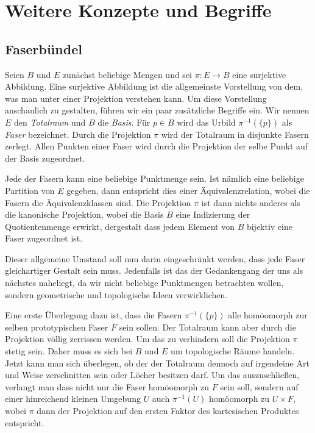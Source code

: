 

\chapter{Weitere Konzepte und Begriffe}

\section{Faserbündel}

Seien $B$ und $E$ zunächst beliebige Mengen und sei $\pi\colon E\to B$
eine surjektive Abbildung. Eine surjektive Abbildung ist die allgemeinste
Vorstellung von dem, was man unter einer Projektion verstehen kann.
Um diese Vorstellung anschaulich zu gestalten, führen wir ein paar
zusätzliche Begriffe ein. Wir nennen $E$ den \emph{Totalraum} und $B$
die \emph{Basis}. Für $p\in B$ wird das Urbild $\pi^{-1}(\{p\})$ als
\emph{Faser} bezeichnet. Durch die Projektion $\pi$ wird der Totalraum
in disjunkte Fasern zerlegt. Allen Punkten einer Faser wird durch
die Projektion der selbe Punkt auf der Basis zugeordnet.

Jede der Fasern kann eine beliebige Punktmenge sein. Ist nämlich eine
beliebige Partition von $E$ gegeben, dann entspricht dies einer
Äquivalenzrelation, wobei die Fasern die Äquivalenzklassen sind.
Die Projektion $\pi$ ist dann nichts anderes als die kanonische
Projektion, wobei die Basis $B$ eine Indizierung der Quotientenmenge
erwirkt, dergestalt dass jedem Element von $B$ bijektiv eine Faser
zugeordnet ist.

Dieser allgemeine Umstand soll nun darin eingeschränkt werden, dass
jede Faser gleichartiger Gestalt sein muss. Jedenfalls ist das der
Gedankengang der uns als nächstes naheliegt, da wir nicht beliebige
Punktmengen betrachten wollen, sondern geometrische und topologische
Ideen verwirklichen.

Eine erste Überlegung dazu ist, dass die Fasern $\pi^{-1}(\{p\})$ alle
homöomorph zur selben prototypischen Faser $F$ sein sollen. Der
Totalraum kann aber durch die Projektion völlig zerrissen werden.
Um das zu verhindern soll die Projektion $\pi$ stetig sein. Daher muss
es sich bei $B$ und $E$ um topologische Räume handeln. Jetzt kann man
sich überlegen, ob der der Totalraum dennoch auf irgendeine Art und
Weise zerschnitten sein oder Löcher besitzen darf. Um das auszuschließen,
verlangt man dass nicht nur die Faser homöomorph zu $F$ sein soll,
sondern auf einer hinreichend kleinen Umgebung $U$ auch
$\pi^{-1}(U)$ homöomorph zu $U\times F$, wobei $\pi$ dann der
Projektion auf den ersten Faktor des kartesischen Produktes
entspricht.

